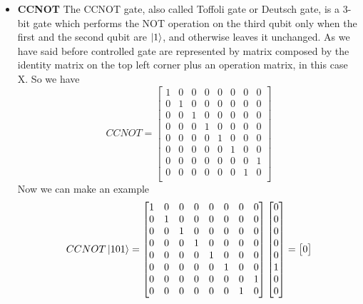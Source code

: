 \documentclass[main.tex]{subfiles}
\theoremstyle{definition}
\begin{document}
\begin{itemize}
	\item \textbf{CCNOT} The CCNOT gate, also called Toffoli gate or Deutsch gate, is a 3-bit gate
	which performs the NOT operation on the third qubit only when the first and the second qubit are
	$\ket{1}$, and otherwise leaves it unchanged. As we have said before controlled gate are represented 
	by matrix composed by the identity matrix on the top left corner plus an operation matrix, in this 
	case X. So we have
	\begin{equation}
	CCNOT=
	\begin{bmatrix}
	1 & 0 & 0 & 0 & 0 & 0 & 0 & 0\\
	0 & 1 & 0 & 0 & 0 & 0 & 0 & 0\\
	0 & 0 & 1 & 0 & 0 & 0 & 0 & 0\\
	0 & 0 & 0 & 1 & 0 & 0 & 0 & 0\\
	0 & 0 & 0 & 0 & 1 & 0 & 0 & 0\\
	0 & 0 & 0 & 0 & 0 & 1 & 0 & 0\\
	0 & 0 & 0 & 0 & 0 & 0 & 0 & 1\\
	0 & 0 & 0 & 0 & 0 & 0 & 1 & 0\\
	\end{bmatrix}
	\end{equation}
	Now we can make an example	 
	$$
	CCNOT\ket{101}=
	\begin{bmatrix}
	1 & 0 & 0 & 0 & 0 & 0 & 0 & 0\\
	0 & 1 & 0 & 0 & 0 & 0 & 0 & 0\\
	0 & 0 & 1 & 0 & 0 & 0 & 0 & 0\\
	0 & 0 & 0 & 1 & 0 & 0 & 0 & 0\\
	0 & 0 & 0 & 0 & 1 & 0 & 0 & 0\\
	0 & 0 & 0 & 0 & 0 & 1 & 0 & 0\\
	0 & 0 & 0 & 0 & 0 & 0 & 0 & 1\\
	0 & 0 & 0 & 0 & 0 & 0 & 1 & 0\\
	\end{bmatrix}
	\begin{bmatrix}
	0\\
	0\\
	0\\
	0\\
	0\\
	1\\
	0\\
	0\\
	\end{bmatrix}
	=
	\begin{bmatrix}
	0\\

\end{bmatrix}$$
\end{itemize}
\end{document}
